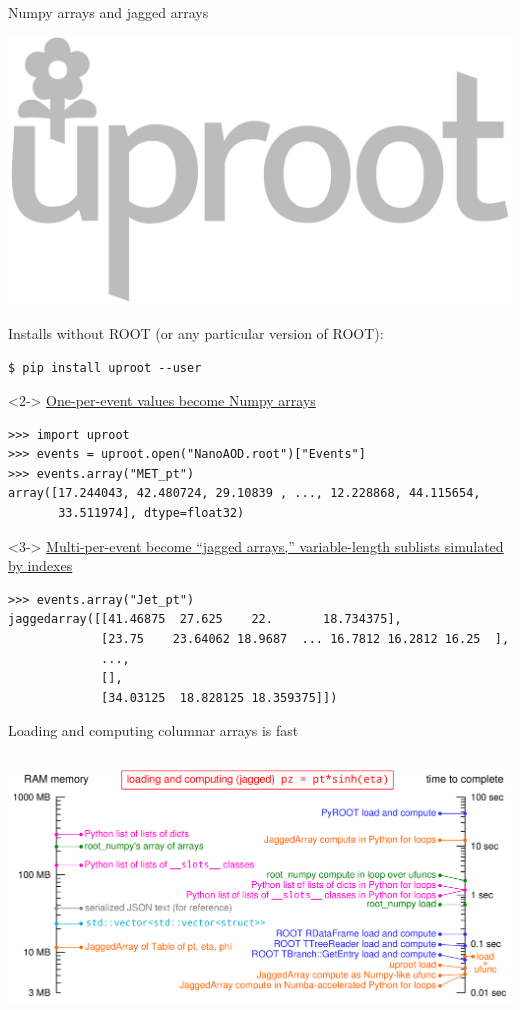 \documentclass[aspectratio=169]{beamer}
\begin{document}
\begin{frame}[fragile]{Numpy arrays and jagged arrays}
\normalsize
\vspace{0.35 cm}

\hfill \includegraphics[height=1 cm]{uproot-logo.pdf}

\vspace{-1.1 cm}
Installs without ROOT (or any particular version of ROOT):

\small
\begin{verbatim}
$ pip install uproot --user
\end{verbatim}
\normalsize

\begin{uncoverenv}<2->
\underline{One-per-event values become Numpy arrays}

\small
\begin{verbatim}
>>> import uproot
>>> events = uproot.open("NanoAOD.root")["Events"]
>>> events.array("MET_pt")
array([17.244043, 42.480724, 29.10839 , ..., 12.228868, 44.115654,
       33.511974], dtype=float32)
\end{verbatim}
\end{uncoverenv}
\normalsize

\begin{uncoverenv}<3->
\underline{Multi-per-event become ``jagged arrays,'' variable-length sublists simulated by indexes}

\small
\begin{verbatim}
>>> events.array("Jet_pt")
jaggedarray([[41.46875  27.625    22.       18.734375],
             [23.75    23.64062 18.9687  ... 16.7812 16.2812 16.25  ],
             ...,
             [],
             [34.03125  18.828125 18.359375]])
\end{verbatim}
\end{uncoverenv}
\end{frame}

\begin{frame}{Loading and computing columnar arrays is fast}
\vspace{0.3 cm}
\begin{columns}
\includegraphics[width=\linewidth]{logscales.pdf}
\end{columns}
\end{frame}
\end{document}
